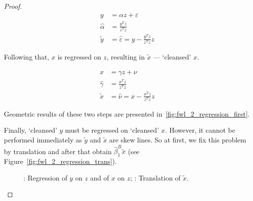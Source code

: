 \begin{proof}
\begin{equation}\label{eq:fwl_2_y_clean}
\begin{aligned}
y &= \alpha z + \varepsilon \\
\hat\alpha &= \frac{y^T z}{z^T z} \\
\tilde{y} &= \hat\varepsilon = y - \frac{y^T z}{z^T z}z
\end{aligned}
\end{equation}

Following that, $x$ is regressed on $z$, resulting in $\tilde{x}$ — `cleansed' $x$.

\begin{equation}\label{eq:fwl_2_x_clean}
\begin{aligned}
x &= \gamma z + \nu \\
\hat\gamma &= \frac{x^T z}{z^T z} \\
\tilde{x} &= \hat\nu = x - \frac{x^T z}{z^T z}z
\end{aligned}
\end{equation}

Geometric results of these two steps are presented in~\ref{fig:fwl_2_regression_first}.

Finally, `cleansed' $y$ must be regressed on `cleansed' $x$.
However, it cannot be performed immediately as $\tilde{y}$ and $\tilde{x}$ are skew lines.
So at first, we fix this problem by translation and after that obtain
$\hat\beta_1^{B}\tilde x$ (see Figure~\ref{fig:fwl_2_regression_trans}).

\begin{figure}[ht!]
\begin{center}
\hspace{4ex}
\caption{: Regression of $y$ on $z$ and of $x$ on $z$;
: Translation of $\tilde{x}$.}
\end{center}
\end{figure}


\end{proof}
